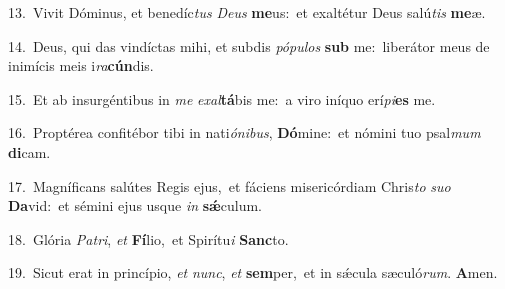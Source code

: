 {\numbfont\textcolor{\numbcolor}{13.}}~Vivit Dóminus, et benedíc\textit{tus} \textit{De}\-\textit{us} \textbf{me}\-us:~\star et exaltétur Deus salú\textit{tis} \textbf{me}\-æ.\par
{\numbfont\textcolor{\numbcolor}{14.}}~Deus, qui das vindíctas mihi, et subdis \textit{pó}\-\textit{pu}\textit{los} \textbf{sub} me:~\star liberátor meus de inimícis meis i\-\textit{ra}\-\textbf{cún}dis.\par
{\numbfont\textcolor{\numbcolor}{15.}}~Et ab insurgéntibus in \textit{me} \textit{ex}\-\textit{al}\textbf{tá}bis me:~\star a viro iníquo erí\-\textit{pi}\-\textbf{es} me.\par
{\numbfont\textcolor{\numbcolor}{16.}}~Proptérea confitébor tibi in nati\-\textit{ó}\-\textit{ni}\textit{bus}, \textbf{Dó}\-mine:~\star et nómini tuo psal\textit{mum} \textbf{di}\-cam.\par
{\numbfont\textcolor{\numbcolor}{17.}}~Magníficans salútes Regis ejus,~\dagger et fáciens misericórdiam Chris\textit{to} \textit{su}\-\textit{o} \textbf{Da}\-vid:~\star et sémini ejus usque \textit{in} \textbf{sǽ}\-culum.\par
{\numbfont\textcolor{\numbcolor}{18.}}~Glória \textit{Pa}\-\textit{tri}, \textit{et} \textbf{Fí}\-lio,~\star et Spirítu\textit{i} \textbf{Sanc}\-to.\par
{\numbfont\textcolor{\numbcolor}{19.}}~Sicut erat in princípio, \textit{et} \textit{nunc}\-, \textit{et} \textbf{sem}\-per,~\star et in sǽcula sæculó\-\textit{rum}\-. \textbf{A}\-men.\par

